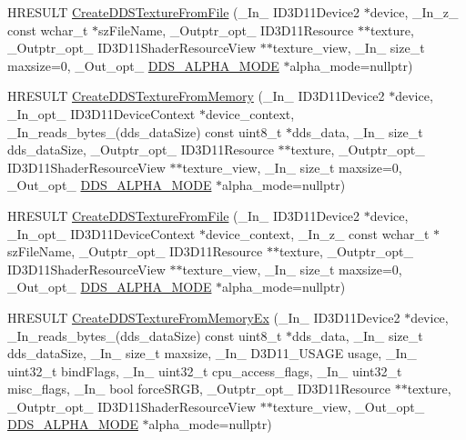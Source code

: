 \begin{DoxyCompactItemize}
\item 
H\+R\+E\+S\+U\+LT \hyperlink{namespacemage_a9ebb3d4391bb4b5b1393fc1efce57d8e}{Create\+D\+D\+S\+Texture\+From\+File} (\+\_\+\+In\+\_\+ I\+D3\+D11\+Device2 $\ast$device, \+\_\+\+In\+\_\+z\+\_\+ const wchar\+\_\+t $\ast$sz\+File\+Name, \+\_\+\+Outptr\+\_\+opt\+\_\+ I\+D3\+D11\+Resource $\ast$$\ast$texture, \+\_\+\+Outptr\+\_\+opt\+\_\+ I\+D3\+D11\+Shader\+Resource\+View $\ast$$\ast$texture\+\_\+view, \+\_\+\+In\+\_\+ size\+\_\+t maxsize=0, \+\_\+\+Out\+\_\+opt\+\_\+ \hyperlink{namespacemage_a0c586a2bad862f4858900ca121ca80c2}{D\+D\+S\+\_\+\+A\+L\+P\+H\+A\+\_\+\+M\+O\+DE} $\ast$alpha\+\_\+mode=nullptr)
\item 
H\+R\+E\+S\+U\+LT \hyperlink{namespacemage_a0f7b5b2cc18c9d007e91397ac7916aad}{Create\+D\+D\+S\+Texture\+From\+Memory} (\+\_\+\+In\+\_\+ I\+D3\+D11\+Device2 $\ast$device, \+\_\+\+In\+\_\+opt\+\_\+ I\+D3\+D11\+Device\+Context $\ast$device\+\_\+context, \+\_\+\+In\+\_\+reads\+\_\+bytes\+\_\+(dds\+\_\+data\+Size) const uint8\+\_\+t $\ast$dds\+\_\+data, \+\_\+\+In\+\_\+ size\+\_\+t dds\+\_\+data\+Size, \+\_\+\+Outptr\+\_\+opt\+\_\+ I\+D3\+D11\+Resource $\ast$$\ast$texture, \+\_\+\+Outptr\+\_\+opt\+\_\+ I\+D3\+D11\+Shader\+Resource\+View $\ast$$\ast$texture\+\_\+view, \+\_\+\+In\+\_\+ size\+\_\+t maxsize=0, \+\_\+\+Out\+\_\+opt\+\_\+ \hyperlink{namespacemage_a0c586a2bad862f4858900ca121ca80c2}{D\+D\+S\+\_\+\+A\+L\+P\+H\+A\+\_\+\+M\+O\+DE} $\ast$alpha\+\_\+mode=nullptr)
\item 
H\+R\+E\+S\+U\+LT \hyperlink{namespacemage_abec1d90d8e2d6c8ce1bfa74c2854bdfe}{Create\+D\+D\+S\+Texture\+From\+File} (\+\_\+\+In\+\_\+ I\+D3\+D11\+Device2 $\ast$device, \+\_\+\+In\+\_\+opt\+\_\+ I\+D3\+D11\+Device\+Context $\ast$device\+\_\+context, \+\_\+\+In\+\_\+z\+\_\+ const wchar\+\_\+t $\ast$sz\+File\+Name, \+\_\+\+Outptr\+\_\+opt\+\_\+ I\+D3\+D11\+Resource $\ast$$\ast$texture, \+\_\+\+Outptr\+\_\+opt\+\_\+ I\+D3\+D11\+Shader\+Resource\+View $\ast$$\ast$texture\+\_\+view, \+\_\+\+In\+\_\+ size\+\_\+t maxsize=0, \+\_\+\+Out\+\_\+opt\+\_\+ \hyperlink{namespacemage_a0c586a2bad862f4858900ca121ca80c2}{D\+D\+S\+\_\+\+A\+L\+P\+H\+A\+\_\+\+M\+O\+DE} $\ast$alpha\+\_\+mode=nullptr)
\item 
H\+R\+E\+S\+U\+LT \hyperlink{namespacemage_a7102f0f3479074447a084e95bce3cc14}{Create\+D\+D\+S\+Texture\+From\+Memory\+Ex} (\+\_\+\+In\+\_\+ I\+D3\+D11\+Device2 $\ast$device, \+\_\+\+In\+\_\+reads\+\_\+bytes\+\_\+(dds\+\_\+data\+Size) const uint8\+\_\+t $\ast$dds\+\_\+data, \+\_\+\+In\+\_\+ size\+\_\+t dds\+\_\+data\+Size, \+\_\+\+In\+\_\+ size\+\_\+t maxsize, \+\_\+\+In\+\_\+ D3\+D11\+\_\+\+U\+S\+A\+GE usage, \+\_\+\+In\+\_\+ uint32\+\_\+t bind\+Flags, \+\_\+\+In\+\_\+ uint32\+\_\+t cpu\+\_\+access\+\_\+flags, \+\_\+\+In\+\_\+ uint32\+\_\+t misc\+\_\+flags, \+\_\+\+In\+\_\+ bool force\+S\+R\+GB, \+\_\+\+Outptr\+\_\+opt\+\_\+ I\+D3\+D11\+Resource $\ast$$\ast$texture, \+\_\+\+Outptr\+\_\+opt\+\_\+ I\+D3\+D11\+Shader\+Resource\+View $\ast$$\ast$texture\+\_\+view, \+\_\+\+Out\+\_\+opt\+\_\+ \hyperlink{namespacemage_a0c586a2bad862f4858900ca121ca80c2}{D\+D\+S\+\_\+\+A\+L\+P\+H\+A\+\_\+\+M\+O\+DE} $\ast$alpha\+\_\+mode=nullptr)

\end{DoxyCompactItemize}
